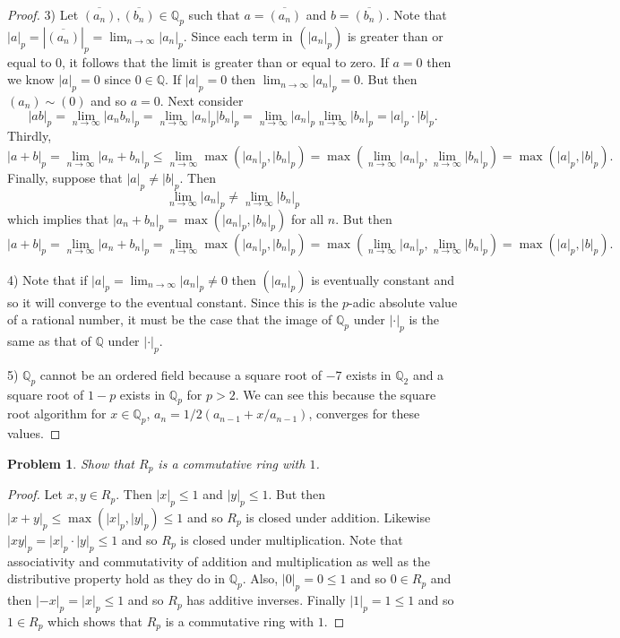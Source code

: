 \documentclass{article}
\newtheorem{problem}{Problem}
\begin{document}
\begin{flushleft}
\begin{proof}
3) Let $\overline{(a_n)}, \overline{(b_n)} \in \mathbb{Q}_p$ such that $a = \overline{(a_n)}$ and $b = \overline{(b_n)}$. Note that $|a|_p = |\overline{(a_n)}|_p = \lim_{n \rightarrow \infty} |a_n|_p$. Since each term in $(|a_n|_p)$ is greater than or equal to $0$, it follows that the limit is greater than or equal to zero. If $a = 0$ then we know $|a|_p = 0$ since $0 \in \mathbb{Q}$. If $|a|_p = 0$ then $\lim_{n \rightarrow \infty} |a_n|_p = 0$. But then $(a_n) \sim (0)$ and so $a = 0$. Next consider
\[
|ab|_p = \lim_{n \rightarrow \infty} |a_n b_n|_p = \lim_{n \rightarrow \infty} |a_n|_p |b_n|_p = \lim_{n \rightarrow \infty} |a_n|_p \lim_{n \rightarrow \infty} |b_n|_p = |a|_p \cdot |b|_p.
\]
Thirdly,
\[
|a + b|_p = \lim_{n \rightarrow \infty} |a_n + b_n|_p \leq \lim_{n \rightarrow \infty} \max(|a_n|_p, |b_n|_p) = \max \left ( \lim_{n \rightarrow \infty} |a_n|_p , \lim_{n \rightarrow \infty} |b_n|_p \right ) = \max (|a|_p, |b|_p).
\]
Finally, suppose that $|a|_p \neq |b|_p$. Then
\[
\lim_{n \rightarrow \infty} |a_n|_p \neq \lim_{n \rightarrow \infty} |b_n|_p
\]
which implies that $|a_n + b_n|_p = \max (|a_n|_p, |b_n|_p)$ for all $n$. But then
\[
|a + b|_p = \lim_{n \rightarrow \infty} |a_n + b_n|_p = \lim_{n \rightarrow \infty} \max (|a_n|_p, |b_n|_p) = \max \left ( \lim_{n \rightarrow \infty} |a_n|_p, \lim_{n \rightarrow \infty} |b_n|_p \right ) = \max (|a|_p, |b|_p).
\]\newline

4) Note that if $|a|_p = \lim_{n \rightarrow \infty} |a_n|_p \neq 0$ then $(|a_n|_p)$ is eventually constant and so it will converge to the eventual constant. Since this is the $p$-adic absolute value of a rational number, it must be the case that the image of $\mathbb{Q}_p$ under $| \cdot |_p$ is the same as that of $\mathbb{Q}$ under $| \cdot |_p$.\newline

5) $\mathbb{Q}_p$ cannot be an ordered field because a square root of $-7$ exists in $\mathbb{Q}_2$ and a square root of $1-p$ exists in $\mathbb{Q}_p$ for $p > 2$. We can see this because the square root algorithm for $x \in \mathbb{Q}_p$, $a_n = 1/2 (a_{n-1} + x/a_{n-1})$, converges for these values.
\end{proof}

\begin{problem}
Show that $R_p$ is a commutative ring with $1$.
\end{problem}
\begin{proof}
Let $x, y \in R_p$. Then $|x|_p \leq 1$ and $|y|_p \leq 1$. But then $|x+y|_p \leq \max (|x|_p, |y|_p) \leq 1$ and so $R_p$ is closed under addition. Likewise $|xy|_p = |x|_p \cdot |y|_p \leq 1$ and so $R_p$ is closed under multiplication. Note that associativity and commutativity of addition and multiplication as well as the distributive property hold as they do in $\mathbb{Q}_p$. Also, $|0|_p = 0 \leq 1$ and so $0 \in R_p$ and then $|-x|_p = |x|_p \leq 1$ and so $R_p$ has additive inverses. Finally $|1|_p = 1 \leq 1$ and so $1 \in R_p$ which shows that $R_p$ is a commutative ring with $1$.
\end{proof}


\end{flushleft}
\end{document}
